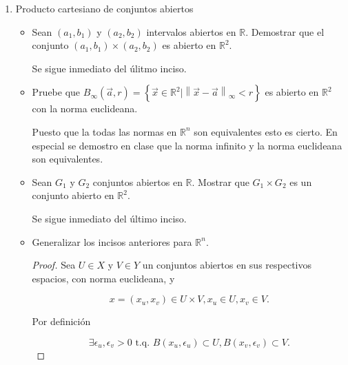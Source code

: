 \documentclass[letterpaper]{article}
\theoremstyle{definition}
\theoremstyle{lemathm}
\theoremstyle{lemathm}
\theoremstyle{lemathm}
\theoremstyle{lemademthm}
\newcommand{\pars}[1]{\left( #1 \right) }
\newcommand{\norm}[1]{\left\lVert#1\right\rVert}
\newcommand{\set}[1]{\left \{ #1 \right\} }
\newcommand{\RR}{\mathbb{R}}
\newcommand{\1}{\mathbbm{1}}
\begin{document}
\begin{enumerate}
\begin{itemize}
\begin{proof}
				por lo tanto
				
				\[\overline{A} = \bigcap\set{V | A \subset V, V \text{es cerrado en} \RR^n}.\]

			\end{proof}

			\item $A^{coc} = A^{-}$.
			
			\begin{proof}
			
				Debido a que $A^{-c} = A^{co}$ entonces $A^{coc} = A^{-cc} = A^{-}$.

			\end{proof}

		\end{itemize}

		\item Producto cartesiano de conjuntos abiertos
		
		\begin{itemize}
			\item Sean $\pars{a_1,b_1}$ y $\pars{a_2,b_2}$ intervalos abiertos en $\RR$. Demostrar que el conjunto $\pars{a_1,b_1}\times\pars{a_2,b_2}$ es abierto en $\RR^2$.
			
			Se sigue inmediato del úlitmo inciso.

			\item Pruebe que $B_{\infty}\pars{\vec{a},r} = \set{\vec{x}\in\RR^2 | \norm{\vec{x}-\vec{a}}_{\infty} < r}$ es abierto en $\RR^2$ con la norma euclideana.
			
			Puesto que la todas las normas en $\RR^n$ son equivalentes esto es cierto. En especial se demostro en clase que la norma infinito y la norma euclideana son equivalentes.

			\item Sean $G_1$ y $G_2$ conjuntos abiertos en $\RR$. Mostrar que $G_1\times G_2$ es un conjunto abierto en $\RR^2$.
			
			Se sigue inmediato del último inciso.

			\item Generalizar los incisos anteriores para $\RR^n$.
			
			\begin{proof}
				Sea $U\in X$ y $V \in Y$ un conjuntos abiertos en sus respectivos espacios, con norma euclideana, y 
				
				\[x = (x_u, x_v) \in U \times V, x_u \in U, x_v\in V.\]
				
				Por definición 
				
				\[\exists \epsilon_u,\epsilon_v > 0 \text{ t.q. } B\pars{x_u,\epsilon_u}\subset U, B\pars{x_v,\epsilon_v}\subset V.\]
				

\end{proof}
\end{itemize}
\end{enumerate}
\end{document}
